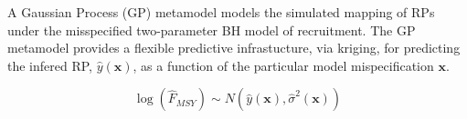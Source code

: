 \documentclass[a0paper,portrait]{baposter}
\begin{document}
\begin{poster}
{        %

	A Gaussian Process (GP) metamodel models the simulated mapping of RPs under the 
	misspecified two-parameter BH model of recruitment. The GP metamodel provides a 
	flexible predictive infrastucture, via kriging, for predicting the infered RP, 
	$\hat y(\textbf{x})$, as a function of the particular model mispecification $\textbf{x}$.
	
        \begin{equation}
        \log(\hat{F}_{MSY}) \sim N(\hat y(\textbf{x}), \hat \sigma^2(\textbf{x}))
        \end{equation}



	
}

%
\headerbox{3. Clustering}{name=cluster, column=0, below=model, span=2}{

}
\end{poster}
\end{document}
